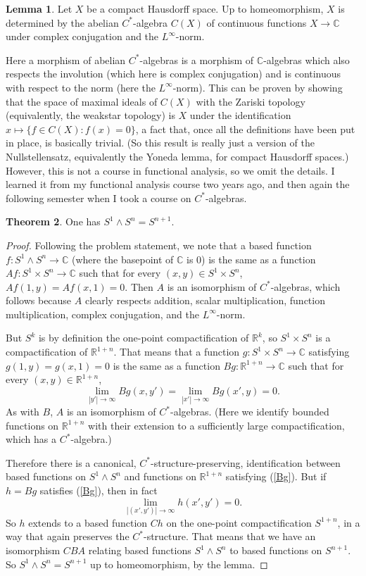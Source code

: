 \documentclass[10pt]{article}
\newcommand{\RR}{\mathbb{R}}
\newcommand{\CC}{\mathbb{C}}
\theoremstyle{definition}
\newtheorem{lemma}{Lemma}[exer]
\newtheorem{theorem}[lemma]{Theorem}
\begin{document}
\begin{lemma}
Let $X$ be a compact Hausdorff space.
Up to homeomorphism, $X$ is determined by the abelian $C^*$-algebra $C(X)$ of continuous functions $X \to \CC$ under complex conjugation and the $L^\infty$-norm.
\end{lemma}
Here a morphism of abelian $C^*$-algebras is a morphism of $\CC$-algebras which also respects the involution (which here is complex conjugation) and is continuous with respect to the norm (here the $L^\infty$-norm).
This can be proven by showing that the space of maximal ideals of $C(X)$ with the Zariski topology (equivalently, the weakstar topology) is $X$ under the identification $x \mapsto \{f \in C(X): f(x) = 0\}$, a fact that, once all the definitions have been put in place, is basically trivial.
(So this result is really just a version of the Nullstellensatz, equivalently the Yoneda lemma, for compact Hausdorff spaces.)
However, this is not a course in functional analysis, so we omit the details.
I learned it from my functional analysis course two years ago, and then again the following semester when I took a course on $C^*$-algebras.

\begin{theorem}
One has $S^1 \wedge S^n = S^{n+1}$.
\end{theorem}
\begin{proof}
Following the problem statement, we note that a based function $f: S^1 \wedge S^n \to \CC$ (where the basepoint of $\CC$ is $0$) is the same as a function $Af: S^1 \times S^n \to \CC$ such that for every $(x, y) \in S^1 \times S^n$, $Af(1, y) = Af(x, 1) = 0$.
Then $A$ is an isomorphism of $C^*$-algebras, which follows because $A$ clearly respects addition, scalar multiplication, function multiplication, complex conjugation, and the $L^\infty$-norm.

But $S^k$ is by definition the one-point compactification of $\RR^k$, so $S^1 \times S^n$ is a compactification of $\RR^{1+n}$.
That means that a function $g: S^1 \times S^n \to \CC$ satisfying $g(1, y) = g(x, 1) = 0$ is the same as a function $Bg: \RR^{1 + n} \to \CC$ such that for every $(x, y) \in \RR^{1+n}$,
\begin{equation}
\label{Bg}
\lim_{|y'| \to \infty} Bg(x, y') = \lim_{|x'| \to \infty} Bg(x', y) = 0.
\end{equation}
As with $B$, $A$ is an isomorphism of $C^*$-algebras.
(Here we identify bounded functions on $\RR^{1+n}$ with their extension to a sufficiently large compactification, which has a $C^*$-algebra.)

Therefore there is a canonical, $C^*$-structure-preserving, identification between based functions on $S^1 \wedge S^n$ and functions on $\RR^{1+n}$ satisfying (\ref{Bg}).
But if $h = Bg$ satisfies (\ref{Bg}), then in fact
$$\lim_{|(x', y')| \to \infty} h(x', y') = 0.$$
So $h$ extends to a based function $Ch$ on the one-point compactification $S^{1+n}$, in a way that again preserves the $C^*$-structure.
That means that we have an isomorphism $CBA$ relating based functions $S^1 \wedge S^n$ to based functions on $S^{n+1}$.
So $S^1 \wedge S^n = S^{n+1}$ up to homeomorphism, by the lemma.
\end{proof}
\end{document}
